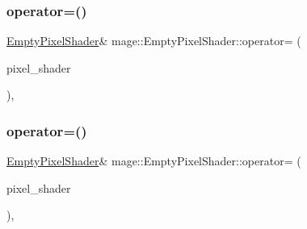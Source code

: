 \subsubsection{\texorpdfstring{operator=()}{operator=()}\hspace{0.1cm}{\footnotesize\ttfamily [1/2]}}
{\footnotesize\ttfamily \hyperlink{classmage_1_1_empty_pixel_shader}{Empty\+Pixel\+Shader}\& mage\+::\+Empty\+Pixel\+Shader\+::operator= (\begin{DoxyParamCaption}\item[{const \hyperlink{classmage_1_1_empty_pixel_shader}{Empty\+Pixel\+Shader} \&}]{pixel\+\_\+shader }\end{DoxyParamCaption})\hspace{0.3cm}{\ttfamily [private]}, {\ttfamily [delete]}}

\hypertarget{classmage_1_1_empty_pixel_shader_a5eee18735b5bc109ca63a913fa8e374d}{}\label{classmage_1_1_empty_pixel_shader_a5eee18735b5bc109ca63a913fa8e374d} 
\subsubsection{\texorpdfstring{operator=()}{operator=()}\hspace{0.1cm}{\footnotesize\ttfamily [2/2]}}
{\footnotesize\ttfamily \hyperlink{classmage_1_1_empty_pixel_shader}{Empty\+Pixel\+Shader}\& mage\+::\+Empty\+Pixel\+Shader\+::operator= (\begin{DoxyParamCaption}\item[{\hyperlink{classmage_1_1_empty_pixel_shader}{Empty\+Pixel\+Shader} \&\&}]{pixel\+\_\+shader }\end{DoxyParamCaption})\hspace{0.3cm}{\ttfamily [private]}, {\ttfamily [delete]}}

